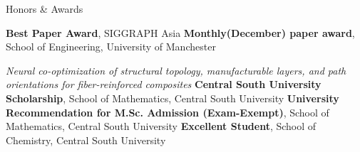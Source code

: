 \begin{rubric}{Honors \& Awards}

\entry*[2025]%
	\textbf{Best Paper Award}, SIGGRAPH Asia
%
\entry*[2025]%
	\textbf{Monthly(December) paper award}, School of Engineering, University of Manchester
	\par \textit{Neural co-optimization of structural topology, manufacturable layers, and path orientations for fiber-reinforced composites}
%
\entry*[2018]%
	\textbf{Central South University Scholarship}, School of Mathematics, Central South University
%
\entry*[2017]%
	\textbf{University Recommendation for M.Sc. Admission (Exam-Exempt)}, School of Mathematics, Central South University
%
\entry*[2014]%
	\textbf{Excellent Student}, School of Chemistry, Central South University
%
\end{rubric}
